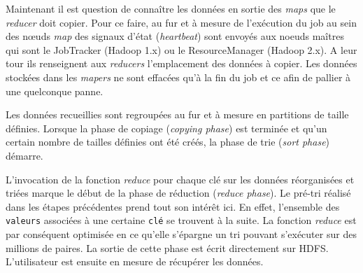 \par Maintenant il est question de connaître les données en sortie des \textit{maps} que le \textit{reducer} doit copier. Pour ce faire, au fur et à mesure de l'exécution du job au sein des n\oe{}uds \textit{map} des signaux d'état (\textit{heartbeat}) sont envoyés aux noeuds maîtres qui sont le JobTracker (Hadoop 1.x) ou le ResourceManager (Hadoop 2.x). A leur tour ils renseignent aux \textit{reducers} l'emplacement des données à copier. Les données stockées dans les \textit{mapers} ne sont effacées qu'à la fin du job et ce afin de pallier à une quelconque panne.

\par Les données recueillies sont regroupées au fur et à mesure en partitions de taille définies. Lorsque la phase de copiage (\textit{copying phase}) est terminée et qu'un certain nombre de tailles définies ont été créés, la phase de trie (\textit{sort phase}) démarre.

\par L'invocation de la fonction \textit{reduce} pour chaque clé sur les données réorganisées et triées marque le début de la phase de réduction (\textit{reduce phase}). Le pré-tri réalisé dans les étapes précédentes prend tout son intérêt ici. En effet, l'ensemble des \texttt{valeurs} associées à une certaine \texttt{clé} se trouvent à la suite. La fonction \textit{reduce} est par conséquent optimisée en ce qu'elle s'épargne un tri pouvant s'exécuter sur des millions de paires. La sortie de cette phase est écrit  directement sur HDFS. L'utilisateur est ensuite en mesure de récupérer les données.


